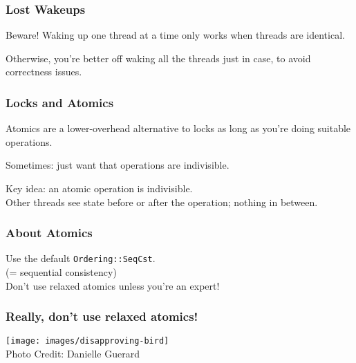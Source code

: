 \begin{frame}
\frametitle{Lost Wakeups}


Beware! Waking up one thread at a time only works when threads are identical.

Otherwise, you're better off waking all the threads just in case, to avoid correctness issues.

\end{frame}

\begin{frame}
\frametitle{Locks and Atomics}

 Atomics are a lower-overhead alternative to
locks as long as you're doing suitable operations. 

Sometimes: just want that operations are indivisible.

Key idea: an \alert{atomic operation} is indivisible.\\
\quad Other threads see state before or after the operation; nothing in between.

\end{frame}


\begin{frame}[fragile]
  \frametitle{About Atomics}

\vspace*{-2em}

\Large
    Use the default {\tt Ordering::SeqCst}.\\
    (= sequential consistency)\\[1em]

    \alert{Don't use relaxed atomics unless you're an expert!}\\[1em]
    
    
\end{frame}



\begin{frame}[fragile]
  \frametitle{Really, don't use relaxed atomics!}
  \begin{center}
    \texttt{[image: images/disapproving-bird]}\\
    Photo Credit: Danielle Guerard
  \end{center}
\end{frame}

